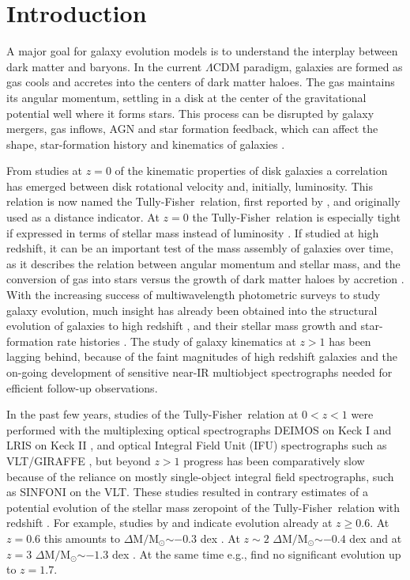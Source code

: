 \documentclass{emulateapj}
\newcommand{\msun}{$\mathrm{M_{\odot}}$}
\newcommand{\tf}{Tully-Fisher}
\begin{document}
\section{Introduction}

A major goal for galaxy evolution models is to understand the interplay between dark matter and baryons. In the current $\Lambda$CDM paradigm, galaxies are formed as gas cools and accretes into the centers of dark matter haloes. The gas maintains its angular momentum, settling in a disk at the center of the gravitational potential well \citep{Fall80} where it forms stars. This process can be disrupted by galaxy mergers, gas inflows, AGN and star formation feedback, which can affect the shape, star-formation history and kinematics of galaxies \citep[e.g.][]{Hammer05}.

From studies at $z=0$ of the kinematic properties of disk galaxies a correlation has emerged between disk rotational velocity and, initially, luminosity. This relation is now named the \tf\ relation, first reported by \citet{Tully77}, and originally used as a distance indicator. At $z=0$ the \tf\ relation is especially tight if expressed in terms of stellar mass instead of luminosity \citep{Bell01}. If studied at high redshift, it can be an important test of the mass assembly of galaxies over time, as it describes the relation between angular momentum and stellar mass, and the conversion of gas into stars versus the growth of dark matter haloes by accretion \citep[e.g.][]{Fall80,Mo98,Sales10}. With the increasing success of multiwavelength photometric surveys to study galaxy evolution, much insight has already been obtained into the structural evolution of galaxies to high redshift \citep[e.g.][]{Franx08,vanderWel14a,Straatman15}, and their stellar mass growth and star-formation rate histories \citep[e.g.][]{Whitaker12,Tomczak14,Tomczak15}. The study of galaxy kinematics at $z>1$ has been lagging behind, because of the faint magnitudes of high redshift galaxies and the on-going development of sensitive near-IR multiobject spectrographs needed for efficient follow-up observations.

In the past few years, studies of the \tf\ relation at $0 < z < 1$ were performed with the multiplexing optical spectrographs DEIMOS on Keck I \citep{Kassin07,Miller11} and LRIS on Keck II \citep{Miller12}, and optical Integral Field Unit (IFU) spectrographs such as VLT/GIRAFFE \citep{Puech08}, but beyond $z>1$ progress has been comparatively slow because of the reliance on mostly single-object integral field spectrographs, such as SINFONI \citep{Cresci09,Gnerucci11,Vergani12} on the VLT. These studies resulted in contra{ry} estimates of a potential evolution of the stellar mass zeropoint of the \tf\ relation with redshift {\citep{Glazebrook13}}. For example, studies by \citet{Puech08,Vergani12,Cresci09,Gnerucci11} and \citet{Simons16} indicate evolution already {at $z\geqslant0.6$}. At $z=0.6$ this amounts to $\Delta \mathrm{M}/$\msun$\sim-0.3$ dex \citep{Puech08}. At {$z\sim2$} $\Delta \mathrm{M}/$\msun$\sim-0.4$ dex  {\citep{Cresci09,Simons16}} and at $z=3$ $\Delta \mathrm{M}/$\msun$\sim-1.3$ dex \citep{Gnerucci11}. At the same time e.g., \citet{Miller11,Miller12} find no significant evolution up to $z=1.7$. 
\end{document}
